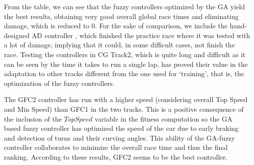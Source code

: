 \documentclass[conference]{IEEEtran}
\begin{document}
From the table, we can see that the fuzzy controllers optimized by the
GA yield the best results, obtaining very good overall global race
times and eliminating damage, which is reduced to 0. For the sake of
comparison, we include the hand-designed AD controller \cite{evo17},
which finished the practice race where it was tested with a lot of
damage, implying that it could, in some difficult cases, not finish
the race. 
Testing the controllers in CG Track2, which is quite long and
difficult as it can be seen by the time it takes to run a single lap,
has proved their value in the adaptation to other tracks different
from the one used for `training', that is, the optimization of the
fuzzy controllers. 

The GFC2 controller has run with a higher speed (considering overall Top
Speed and Min Speed) than GFC1 in the two tracks. This is a positive
consequence of the inclusion of the $TopSpeed$ variable in the fitness
computation so the GA based fuzzy controller has optimized the speed
of the car due to early braking and detection of turns and their
curving angles. This ability  of the GA-fuzzy controller collaborates
to minimize the overall race time and thus the final ranking.
According to these results, GFC2 seems to be the best controller.
\end{document}
